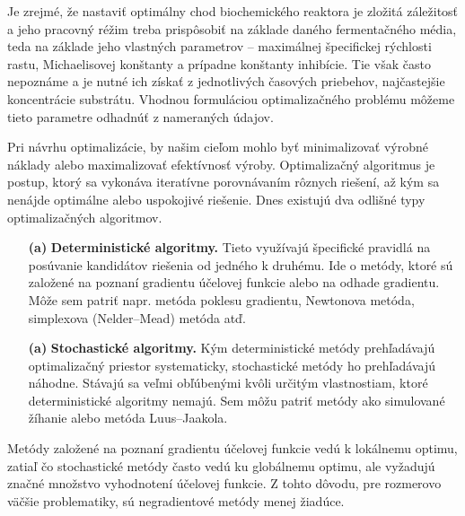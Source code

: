 Je zrejmé, že nastaviť optimálny chod biochemického reaktora je zložitá záležitosť a jeho pracovný réžim treba prispôsobiť na základe daného fermentačného média, teda na základe jeho vlastných parametrov -- maximálnej špecifickej rýchlosti rastu, Michaelisovej konštanty a prípadne konštanty inhibície. Tie však často nepoznáme a je nutné ich získať z jednotlivých časových priebehov, najčastejšie koncentrácie substrátu. Vhodnou formuláciou optimalizačného problému môžeme tieto parametre odhadnúť z nameraných údajov.

Pri návrhu optimalizácie, by našim cieľom mohlo byť minimalizovať výrobné náklady alebo maximalizovať efektívnosť výroby. Optimalizačný algoritmus je postup, ktorý sa vykonáva iteratívne porovnávaním rôznych riešení, až kým sa nenájde optimálne alebo uspokojivé riešenie. Dnes existujú dva odlišné typy optimalizačných algoritmov.

\begin{itemize}
	\item[\textbf{(a)}] \textbf{Deterministické algoritmy.} 
	Tieto využívajú špecifické pravidlá na posúvanie kandidátov riešenia od jedného k druhému. Ide o metódy, ktoré sú založené na poznaní gradientu účelovej funkcie alebo na odhade gradientu. Môže sem patriť napr. metóda poklesu gradientu, Newtonova metóda, simplexova (Nelder--Mead) metóda atď.
	\item[\textbf{(a)}] \textbf{Stochastické algoritmy.} 
	Kým deterministické metódy prehľadávajú optimalizačný priestor systematicky, stochastické metódy ho prehľadávajú náhodne. Stávajú sa veľmi obľúbenými kvôli určitým vlastnostiam, ktoré deterministické algoritmy nemajú. Sem môžu patriť metódy ako simulované žíhanie alebo metóda Luus--Jaakola.
\end{itemize}

Metódy založené na poznaní gradientu účelovej funkcie vedú k lokálnemu optimu, zatiaľ čo stochastické metódy často vedú ku globálnemu optimu, ale vyžadujú značné množstvo vyhodnotení účelovej funkcie. Z tohto dôvodu, pre rozmerovo väčšie problematiky, sú negradientové metódy menej žiadúce.
